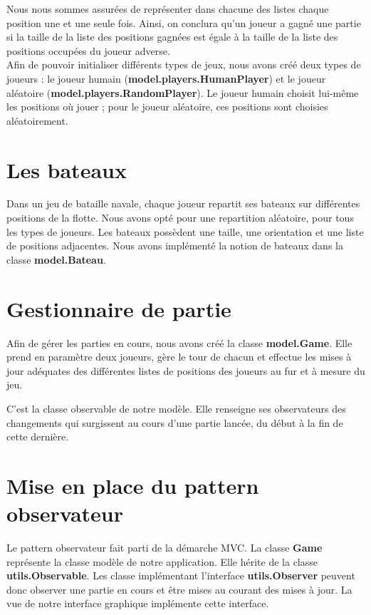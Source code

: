 \documentclass[a4paper, 12pt]{report}
\begin{document}
    Nous nous sommes assurées de représenter dans chacune des listes chaque position une et une seule fois. Ainsi, on
    conclura qu'un joueur a gagné une partie si la taille de la liste des positions gagnées est égale à la taille de la
    liste des positions occupées du joueur adverse. \\

    Afin de pouvoir initialiser différents types de jeux, nous avons créé deux types de joueurs : le joueur humain
    (\textbf{model.players.HumanPlayer}) et le joueur aléatoire (\textbf{model.players.RandomPlayer}). Le joueur humain
    choisit lui-même les positions où jouer ; pour le joueur aléatoire, ces positions sont choisies aléatoirement.

    \section{Les bateaux}
    Dans un jeu de bataille navale, chaque joueur repartit ses bateaux sur différentes positions de la flotte. Nous
    avons opté pour une repartition aléatoire, pour tous les types de joueurs.
    Les bateaux possèdent une taille, une orientation et une liste de positions adjacentes.
    Nous avons implémenté la notion de bateaux dans la classe \textbf{model.Bateau}.

    \section{Gestionnaire de partie}
    Afin de gérer les parties en cours, nous avons créé la classe \textbf{model.Game}. Elle prend en paramètre deux
    joueurs, gère le tour de chacun et effectue les mises à jour adéquates des différentes listes de positions des
    joueurs au fur et à mesure du jeu.

    C'est la classe observable de notre modèle. Elle renseigne ses observateurs des changements qui surgissent au cours
    d'une partie lancée, du début à la fin de cette dernière.

    \section{Mise en place du pattern observateur}
    Le pattern observateur fait parti de la démarche MVC. La classe \textbf{Game} représente la classe modèle de notre
    application. Elle hérite de la classe \textbf{utils.Observable}. Les classe implémentant l'interface
    \textbf{utils.Observer} peuvent donc observer une partie en cours et être mises au courant des mises à jour.
    La vue de notre interface graphique implémente cette interface.
\end{document}
